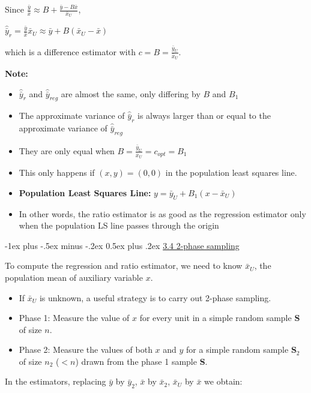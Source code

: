 \documentclass[10pt,landscape]{article}
\makeatletter
\renewcommand{\section}{\@startsection{section}{1}{0mm}%
                                {-1ex plus -.5ex minus -.2ex}%
                                {0.5ex plus .2ex}%
                                {\normalfont\large\bfseries}}
\makeatother
\begin{document}
\begin{multicols}{3}
Since $\frac{\bar{y}}{\bar{x}} \approx B + \frac{\bar{y} - B\bar{x}}{\bar{x}_{U}}$,

\begin{center}
    $\hat{\bar{y}}_{r} = \frac{\bar{y}}{\bar{x}}\bar{x}_{U} \approx \bar{y} + B(\bar{x}_{U}-\bar{x})$
\end{center}

which is a difference estimator with $c = B = \frac{\bar{y}_{U}}{\bar{x}_{U}}$.

\textbf{Note:}
\begin{itemize}
  \item $\hat{\bar{y}}_{r}$ and $\hat{\bar{y}}_{reg}$ are almost the same, only differing by $B$ and $B_{1}$
  \item The approximate variance of $\hat{\bar{y}}_{r}$ is always larger than or equal to the approximate variance of $\hat{\bar{y}}_{reg}$
  \item They are only equal when $B = \frac{\bar{y}_{U}}{\bar{x}_{U}} = c_{opt} = B_{1}$
  \item This only happens if $(x,y) = (0,0)$ in the population least squares line.
  \item \textbf{Population Least Squares Line:} $y = \bar{y}_{U} + B_{1}(x-\bar{x}_{U})$
  \item In other words, the ratio estimator is as good as the regression estimator only when the population LS line passes through the origin
\end{itemize}

\section{\underline{3.4 2-phase sampling}}

To compute the regression and ratio estimator, we need to know $\bar{x}_{U}$, the population mean of auxiliary variable $x$.

\begin{itemize}
  \item If $\bar{x}_{U}$ is unknown, a useful strategy is to carry out 2-phase sampling.
  \item Phase 1: Measure the value of $x$ for every unit in a simple random sample \textbf{S} of size $n$.
  \item Phase 2: Measure the values of both $x$ and $y$ for a simple random sample $\textbf{S}_{2}$ of size $n_{2}$ ($< n $) drawn from the phase 1 sample \textbf{S}.
\end{itemize}

In the estimators, replacing $\bar{y}$ by $\bar{y}_{2}$, $\bar{x}$ by $\bar{x}_{2}$, $\bar{x}_{U}$ by $\bar{x}$ we obtain:


\end{multicols}
\end{document}
